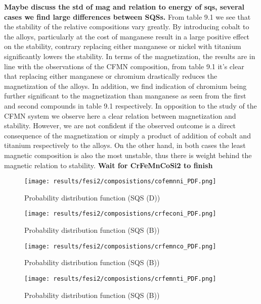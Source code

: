 \textbf{Maybe discuss the std of mag and relation to energy of sqs, several cases we find large differences between SQSs.}
From table 9.1 we see that the stability of the relative compositions vary greatly. By introducing cobalt to the alloys, particularly at the cost of manganese result in a large positive effect on the stability, contrary replacing either manganese or nickel with titanium significantly lowers the stability. In terms of the magnetization, the results are in line with the observations of the CFMN composition, from table 9.1 it's clear that replacing either manganese or chromium drastically reduces the magnetization of the alloys. In addition, we find indication of chromium being further significant to the magnetization than manganese as seen from the first and second compounds in table 9.1 respectively. In opposition to the study of the CFMN system we observe here a clear relation between magnetization and stability. However, we are not confident if the observed outcome is a direct consequence of the magnetization or simply a product of addition of cobalt and titanium respectively to the alloys. On the other hand, in both cases the least magnetic composition is also the most unstable, thus there is weight behind the magnetic relation to stability. \textbf{Wait for CrFeMnCoSi2 to finish}  
  
\begin{figure}[H]
	\centering
	\texttt{[image: results/fesi2/composistions/cofemnni\_PDF.png]}
	\caption{Probability distribution function  (SQS (D))}
\end{figure}

\begin{figure}[H]
	\centering
	\texttt{[image: results/fesi2/composistions/crfeconi\_PDF.png]}
	\caption{Probability distribution function  (SQS (B))}
\end{figure}

\begin{figure}[H]
	\centering
	\texttt{[image: results/fesi2/composistions/crfemnco\_PDF.png]}
	\caption{Probability distribution function  (SQS (B))}
\end{figure}

\begin{figure}[H]
	\centering
	\texttt{[image: results/fesi2/composistions/crfemnti\_PDF.png]}
	\caption{Probability distribution function  (SQS (B))}
\end{figure}

